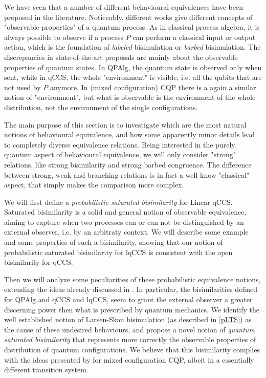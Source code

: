 We have seen that a number of different behavioural equivalences have been proposed in the literature. Noticeably, different works give different concepts of "observable properties" of a quantum process. As in classical process algebra, it is always possible to observe if a process $P$ can perform a classical input or output action, which is the foundation of \textit{labeled} bisimulation or \textit{barbed} bisimulation. The discrepancies in state-of-the-art proposals are mainly about the observable properties of quantum states. In QPAlg, the quantum state is observed only when sent, while in qCCS, the whole "environment" is visible, i.e. all the qubits that are not used by $P$ anymore. In (mixed configuration) CQP there is a again a similar notion of "environment", but what is observable is the environment of the whole distribution, not the environment of the single configurations.

The main purpose of this section is to investigate which are the most natural notions of behavioural equivalence, and how some apparently minor details lead to completely diverse equivalence relations. Being interested in the purely quantum aspect of behavioural equivalence, we will only consider "strong" relations, like strong bisimilarity and strong barbed congruence. The difference between strong, weak and branching relations is in fact a well know "classical" aspect, that simply makes the comparison more complex.

We will first define a \textit{probabilistic saturated bisimilarity} \cite{bonchiGeneralTheoryBarbs2014} for Linear qCCS. Saturated bisimilarity is a solid and general notion of observable equivalence, aiming to capture when two processes can or can not be distinguished by an external observer, i.e. by an arbitraty context. We will describe some example and some properties of such a bisimilarity, showing that our notion of probabilistic saturated bisimilarity for lqCCS is consistent with the open bisimilarity  \cite{dengOpenBisimulationQuantum2012} for qCCS.

Then we will analyze some peculiarities of these probabilistic equivalence notions, extending the ideas already discussed in \cite{davidsonFormalVerificationTechniques2012}. In particular, the bisimilarities defined for QPAlg and qCCS and lqCCS, seem to grant the external observer a greater discerning power then what is prescribed by quantum mechanics.
We identify the well established notion of Larsen-Skou bisimulation (as described in \ref{pLTS}) as the cause of these undesired behaviours, and propose a novel notion of \textit{quantum saturated bisimilarity} that represents more correctly the observable properties of distribution of quantum configurations. We believe that this bisimilarity complies with the ideas presented by \cite{davidsonFormalVerificationTechniques2012} for mixed configuration CQP, albeit in a essentially different transition system.